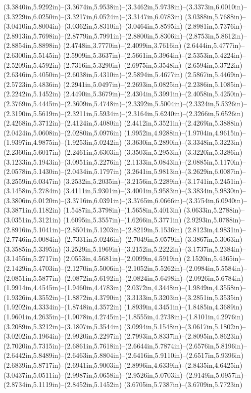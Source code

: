 (3.3840in,5.9292in)--(3.3674in,5.9538in)--(3.3462in,5.9738in)--(3.3373in,6.0010in)--(3.3229in,6.0250in)--(3.3217in,6.0524in)--(3.3147in,6.0783in) (3.0388in,5.7688in)--(3.0410in,5.8004in)--(3.0362in,5.8310in)--(3.0464in,5.8595in) (2.8981in,5.7376in)--(2.8913in,5.7698in)--(2.8779in,5.7991in)--(2.8800in,5.8306in)--(2.8753in,5.8612in)--(2.8854in,5.8898in) (2.4748in,3.7770in)--(2.4099in,3.7616in) (2.6444in,5.4777in)--(2.6300in,5.5145in) (2.5909in,5.3637in)--(2.5661in,5.3964in)--(2.5353in,5.4224in)--(2.5209in,5.4592in) (2.7316in,5.3290in)--(2.6975in,5.3548in)--(2.6594in,5.3722in)--(2.6346in,5.4050in)--(2.6038in,5.4310in)--(2.5894in,5.4677in) (2.5867in,5.4469in)--(2.5723in,5.4836in) (2.2941in,5.0497in)--(2.2693in,5.0825in)--(2.2386in,5.1085in)--(2.2242in,5.1452in) (2.4490in,5.3679in)--(2.4304in,5.3991in)--(2.4058in,5.4250in)--(2.3769in,5.4445in)--(2.3609in,5.4748in)--(2.3392in,5.5004in)--(2.3324in,5.5326in)--(2.3190in,5.5619in)--(2.3211in,5.5934in)--(2.3164in,5.6240in)--(2.3266in,5.6526in) (2.4268in,5.3712in)--(2.4124in,5.4080in) (2.4412in,5.3521in)--(2.4269in,5.3888in) (2.0424in,5.0608in)--(2.0280in,5.0976in) (1.9952in,4.9288in)--(1.9704in,4.9615in)--(1.9397in,4.9875in)--(1.9253in,5.0242in) (3.3630in,5.2890in)--(3.3348in,5.3223in) (2.2360in,5.6017in)--(2.2461in,5.6303in) (3.3503in,5.2953in)--(3.3220in,5.3286in) (3.1233in,5.1943in)--(3.0951in,5.2276in) (2.1133in,5.0843in)--(2.0885in,5.1170in)--(2.0578in,5.1430in)--(2.0434in,5.1797in) (3.2641in,5.9813in)--(3.2629in,6.0087in)--(3.2559in,6.0347in) (3.2532in,5.2035in)--(3.2156in,5.2289in)--(3.1741in,5.2451in)--(3.1458in,5.2784in) (3.4111in,5.9301in)--(3.4001in,5.9583in)--(3.3834in,5.9830in)--(3.3806in,6.0120in)--(3.3716in,6.0391in)--(3.3765in,6.0666in)--(3.3754in,6.0940in)--(3.3871in,6.1182in) (1.5487in,5.3798in)--(1.5658in,5.4013in) (3.0633in,5.2788in)--(3.0351in,5.3121in) (1.6095in,5.3557in)--(1.6266in,5.3771in) (2.9293in,5.0788in)--(2.8916in,5.1041in)--(2.8501in,5.1203in)--(2.8219in,5.1536in) (2.8123in,4.9831in)--(2.7746in,5.0084in)--(2.7331in,5.0246in)--(2.7049in,5.0579in) (3.3867in,5.3063in)--(3.3585in,5.3395in) (3.2529in,5.1969in)--(3.2152in,5.2222in)--(3.1737in,5.2384in)--(3.1455in,5.2717in) (2.0553in,4.5681in)--(2.0099in,4.5919in) (2.1520in,5.4365in)--(2.1429in,5.4703in)--(2.1270in,5.5006in)--(2.1052in,5.5262in)--(2.0984in,5.5584in)--(2.0851in,5.5877in)--(2.0872in,5.6192in)--(2.0824in,5.6498in)--(2.0926in,5.6784in) (1.9914in,4.4545in)--(1.9460in,4.4783in) (2.0372in,4.3448in)--(1.9849in,4.3558in)--(1.9326in,4.3552in)--(1.8872in,4.3790in) (3.3133in,5.3203in)--(3.2851in,5.3535in) (1.9202in,4.3334in)--(1.8748in,4.3572in) (1.8939in,4.3451in)--(1.8485in,4.3689in) (1.9601in,4.2635in)--(1.9078in,4.2745in)--(1.8555in,4.2738in)--(1.8101in,4.2976in) (3.2089in,5.3212in)--(3.1807in,5.3544in) (3.0994in,5.1548in)--(3.0617in,5.1802in)--(3.0202in,5.1964in)--(2.9920in,5.2297in) (2.7993in,5.8337in)--(2.8095in,5.8623in) (2.7020in,5.7315in)--(2.6861in,5.7618in)--(2.6644in,5.7874in)--(2.6576in,5.8196in)--(2.6442in,5.8489in)--(2.6463in,5.8804in)--(2.6416in,5.9110in)--(2.6517in,5.9396in) (2.6839in,5.8717in)--(2.6941in,5.9003in) (2.8996in,4.6339in)--(2.8435in,4.6425in) (3.0437in,5.0511in)--(2.9987in,5.0658in)--(2.9526in,5.0703in)--(2.9149in,5.0957in)--(2.8734in,5.1119in)--(2.8452in,5.1452in) (3.6705in,5.7387in)--(3.6709in,5.7723in) 